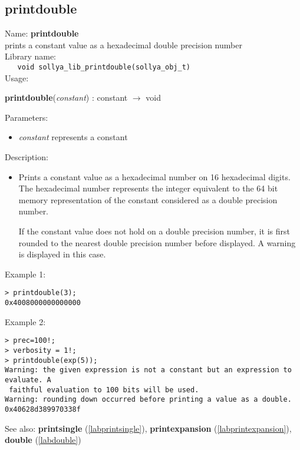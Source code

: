 \subsection{printdouble}
\label{labprintdouble}
\noindent Name: \textbf{printdouble}\\
\phantom{aaa}prints a constant value as a hexadecimal double precision number\\[0.2cm]
\noindent Library name:\\
\verb|   void sollya_lib_printdouble(sollya_obj_t)|\\[0.2cm]
\noindent Usage: 
\begin{center}
\textbf{printdouble}(\emph{constant}) : \textsf{constant} $\rightarrow$ \textsf{void}\\
\end{center}
Parameters: 
\begin{itemize}
\item \emph{constant} represents a constant
\end{itemize}
\noindent Description: \begin{itemize}

\item Prints a constant value as a hexadecimal number on 16 hexadecimal
   digits. The hexadecimal number represents the integer equivalent to
   the 64 bit memory representation of the constant considered as a
   double precision number.
    
   If the constant value does not hold on a double precision number, it
   is first rounded to the nearest double precision number before
   displayed. A warning is displayed in this case.
\end{itemize}
\noindent Example 1: 
\begin{center}\begin{minipage}{15cm}\begin{Verbatim}[frame=single,commandchars=\\\|\~]
> printdouble(3);
0x4008000000000000
\end{Verbatim}
\end{minipage}\end{center}
\noindent Example 2: 
\begin{center}\begin{minipage}{15cm}\begin{Verbatim}[frame=single,commandchars=\\\|\~]
> prec=100!;
> verbosity = 1!;
> printdouble(exp(5));
Warning: the given expression is not a constant but an expression to evaluate. A
 faithful evaluation to 100 bits will be used.
Warning: rounding down occurred before printing a value as a double.
0x40628d389970338f
\end{Verbatim}
\end{minipage}\end{center}
See also: \textbf{printsingle} (\ref{labprintsingle}), \textbf{printexpansion} (\ref{labprintexpansion}), \textbf{double} (\ref{labdouble})
